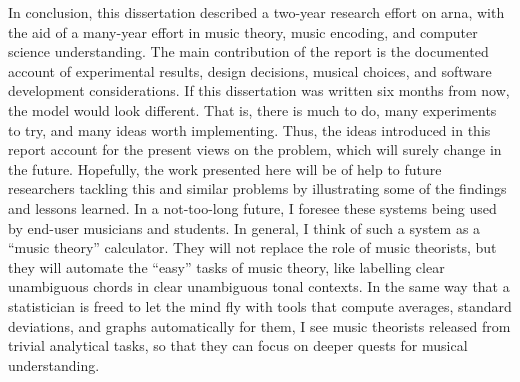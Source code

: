 
In conclusion, this dissertation described a two-year
research effort on \gls{arna}, with the aid of a many-year
effort in music theory, music encoding, and computer science
understanding. The main contribution of the report is the
documented account of experimental results, design
decisions, musical choices, and software development
considerations. If this dissertation was written six months
from now, the model would look different. That is, there is
much to do, many experiments to try, and many ideas worth
implementing. Thus, the ideas introduced in this report
account for the present views on the problem, which will
surely change in the future.  Hopefully, the work presented
here will be of help to future researchers tackling this and
similar problems by illustrating some of the findings and
lessons learned. In a not-too-long future, I foresee these
systems being used by end-user musicians and students. In
general, I think of such a system as a ``music theory''
calculator. They will not replace the role of music
theorists, but they will automate the ``easy'' tasks of
music theory, like labelling clear unambiguous chords in
clear unambiguous tonal contexts. In the same way that a
statistician is freed to let the mind fly with tools that
compute averages, standard deviations, and graphs
automatically for them, I see music theorists released from
trivial analytical tasks, so that they can focus on deeper
quests for musical understanding.
